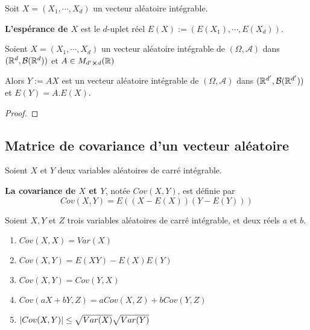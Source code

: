 \begin{definition}
	Soit $X = (X_{1}, \cdots, X_{d})$ un vecteur aléatoire intégrable.

	\textbf{L'espérance de $X$} est le $d$-uplet réel $E(X) := (E(X_{1}),
	\cdots, E(X_{d}))$.
\end{definition}

\begin{proposition}
	Soient $X = (X_{1}, \cdots, X_{d})$ un vecteur aléatoire intégrable de $(\Omega,
	\mathcal{A})$ dans $(\mathbb{R}^{d}, \mathcal{B}(\mathbb{R}^{d}))$ et $A \in
	M_{d' \cross d}(\mathbb{R})$

	Alors $Y := A X$ est un vecteur aléatoire intégrable de $(\Omega,
	\mathcal{A})$ dans $(\mathbb{R}^{d'}, \mathcal{B}(\mathbb{R}^{d'}))$ et $E(Y) = A .
	E(X)$.
\end{proposition}

\ifdefined\outputproof
\begin{proof}

\end{proof}
\fi

\subsection{Matrice de covariance d'un vecteur aléatoire}

\begin{definition}
	Soient $X$ et $Y$ deux variables aléatoires de carré intégrable.

	\textbf{La covariance de $X$ et $Y$}, notée $Cov(X, Y)$, est définie par
	\begin{equation}
		Cov(X, Y) = E( (X - E(X)) (Y - E(Y)) )
	\end{equation}
\end{definition}

\begin{proposition}
	Soient $X, Y$ et $Z$ trois variables aléatoires de carré intégrable, et deux
	réels $a$ et $b$.

	\begin{enumerate}
		\item $Cov(X, X) = Var(X)$
		\item $Cov(X, Y) = E(XY) - E(X) E(Y)$
		\item $Cov(X, Y) = Cov(Y, X)$
		\item $Cov(aX + bY, Z) = a Cov(X, Z) + b Cov(Y, Z)$
		\item $\abs{Cov(X, Y)} \leq \sqrt{Var(X)} \sqrt{Var(Y)}$
	\end{enumerate}
\end{proposition}

